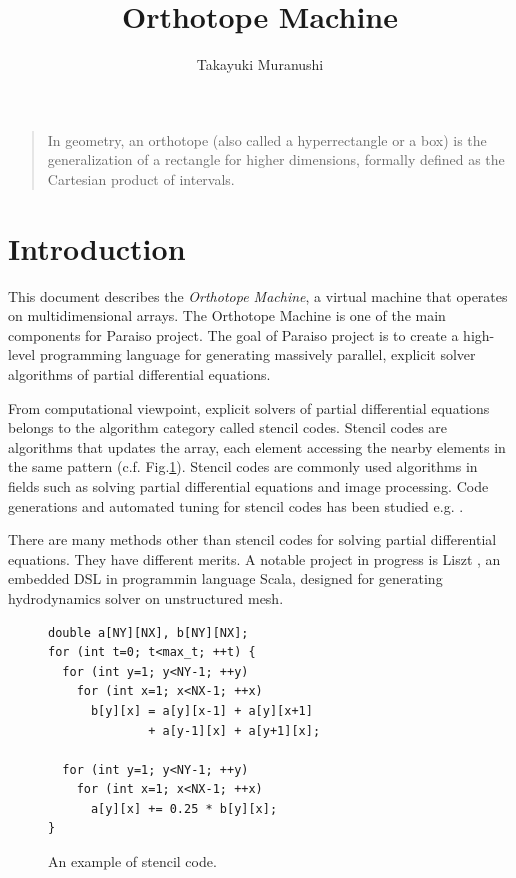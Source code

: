 \documentclass[twocolumn]{article}
\title{Orthotope Machine}
\author{Takayuki Muranushi}
\begin{document}
\maketitle
\begin{quote}
  In geometry, an orthotope (also called a hyperrectangle or a box) is
  the generalization of a rectangle for higher dimensions, formally
  defined as the Cartesian product of intervals.
\end{quote}

\section{Introduction}

This document describes the {\em Orthotope Machine}, a virtual machine that
operates on multidimensional arrays. The Orthotope Machine is one of the main
components for Paraiso project. The goal of Paraiso project is to create a
high-level programming language for generating massively parallel, explicit
solver algorithms of partial differential equations. 


From computational viewpoint, explicit solvers of partial differential
equations belongs to the algorithm category called stencil codes. Stencil
codes are algorithms that updates the array, each element accessing the nearby
elements in the same pattern (c.f. Fig.\ref{FigureStencilPseudoCode}). Stencil
codes are commonly used algorithms in fields such as solving partial
differential equations and image processing. Code generations and automated
tuning for stencil codes has been studied e.g. \cite{Datta:EECS-2009-177,
  Datta:2008:SCO:1413370.1413375}.

There are many methods other than stencil codes for solving partial
differential equations. They have different merits. A notable project in
progress is Liszt \cite{Chafi:2010:LVH:1932682.1869527}, an embedded DSL in
programmin language Scala, designed for generating hydrodynamics solver on
unstructured mesh.

\begin{figure}
\begin{verbatim}
double a[NY][NX], b[NY][NX];
for (int t=0; t<max_t; ++t) {
  for (int y=1; y<NY-1; ++y) 
    for (int x=1; x<NX-1; ++x) 
      b[y][x] = a[y][x-1] + a[y][x+1] 
              + a[y-1][x] + a[y+1][x];

  for (int y=1; y<NY-1; ++y) 
    for (int x=1; x<NX-1; ++x) 
      a[y][x] += 0.25 * b[y][x];
}
\end{verbatim}
\caption{An example of stencil code.}\label{FigureStencilPseudoCode}
\end{figure}
\end{document}
